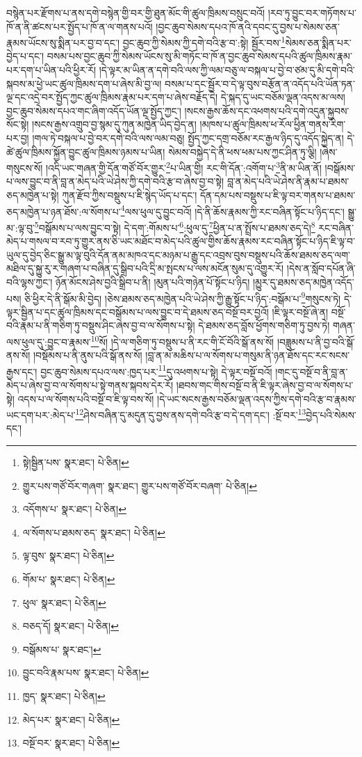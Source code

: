 བསྙེན་པར་རྫོགས་པ་ནས་དགེ་བསྙེན་གྱི་བར་གྱི་ཐུན་མོང་གི་ཚུལ་ཁྲིམས་བསྲུང་བའོ། །རབ་ཏུ་བྱུང་བར་གཏོགས་པ་ཁོ་ན་ནི་ཚངས་པར་སྤྱོད་པ་ཁོ་ན་ལ་གནས་པའོ། །བྱང་ཆུབ་སེམས་དཔའ་ཁོ་ནའི་དབང་དུ་བྱས་པ་སེམས་ཅན་རྣམས་ཡོངས་སུ་སྨིན་པར་བྱ་བ་དང་། བྱང་ཆུབ་ཀྱི་སེམས་ཀྱི་དགེ་བའི་རྩ་བ་:སྟེ། སྦྱོར་བས་\footnote{སྟེ།སྦྱིན་པས་  སྣར་ཐང་།  པེ་ཅིན། }སེམས་ཅན་སྨིན་པར་བྱེད་པ་དང་། བསམ་པས་བྱང་ཆུབ་ཀྱི་སེམས་ཡོངས་སུ་མི་གཏོང་བ་ཁོ་ན་བྱང་ཆུབ་སེམས་དཔའི་ཚུལ་ཁྲིམས་རྣམ་པར་དག་པ་ཡིན་པའི་ཕྱིར་རོ། །དེ་ལྟར་མ་ཡིན་ན་དགེ་བའི་ལས་ཀྱི་ལམ་བཅུ་ལ་བསྐལ་པ་བྱེ་བ་ཙམ་དུ་མི་དགེ་བའི་སྐབས་མ་ཕྱེ་ཡང་ཚུལ་ཁྲིམས་དག་པ་ཞེས་མི་བྱ་ལ། བསམ་པ་དང་སྦྱོར་བ་དེ་ལྟ་བུས་བརྩོན་ན་འདོད་པའི་ཡོན་ཏན་ལྔ་དང་འདྲེ་བར་སྤྱོད་ཀྱང་ཚུལ་ཁྲིམས་རྣམ་པར་དག་པ་ཞེས་བརྗོད་དེ། དེ་སྐད་དུ་ཡང་བཅོམ་ལྡན་འདས་མ་ལས། བྱང་ཆུབ་སེམས་དཔའ་གང་ཞིག་འདོད་ཡོན་ལྔ་སྤྱོད་ཀྱང་། །སངས་རྒྱས་ཆོས་དང་འཕགས་པའི་དགེ་འདུན་སྐྱབས་སོང་སྟེ། །སངས་རྒྱས་འགྲུབ་བྱ་སྙམ་དུ་ཀུན་མཁྱེན་ཡིད་བྱེད་ན། །མཁས་པ་ཚུལ་ཁྲིམས་ཕ་རོལ་ཕྱིན་གནས་རིག་པར་བྱ། །གལ་ཏེ་བསྐལ་པ་བྱེ་བར་དགེ་བའི་ལས་ལམ་བཅུ། སྤྱོད་ཀྱང་དགྲ་བཅོམ་རང་རྒྱལ་ཉིད་དུ་འདོད་སྐྱེད་ན། དེ་ཚེ་ཚུལ་ཁྲིམས་སྐྱོན་བྱུང་ཚུལ་ཁྲིམས་ཉམས་པ་ཡིན། སེམས་བསྐྱེད་དེ་ནི་ཕས་ཕམ་པས་ཀྱང་ཤིན་ཏུ་ལྕི། །ཞེས་གསུངས་སོ། །འདི་ཡང་གཞན་གྱི་དོན་གཙོ་བོར་གྱུར་\footnote{གྱུར་པས་གཙོ་བོར་གཞག་  སྣར་ཐང་། གྱུར་པས་གཙོ་བོར་བཞག་  པེ་ཅིན། }པ་ཡིན་གྱི། རང་གི་དོན་:འགོག་པ་\footnote{འདོགས་པ་  སྣར་ཐང་།  པེ་ཅིན། }ནི་མ་ཡིན་ནོ། །བསྒོམས་པ་ལས་བྱུང་བ་ནི་བླ་ན་མེད་པའི་ཡེ་ཤེས་ཀྱི་དགེ་བའི་རྩ་བ་ཞེས་བྱ་བ་སྟེ། བླ་ན་མེད་པའི་ཡེ་ཤེས་ནི་རྣམ་པ་ཐམས་ཅད་མཁྱེན་པ་སྟེ། ཀུན་རྫོབ་ཀྱིས་བསྡུས་པ་ཇི་སྙེད་ཡོད་པ་དང་། དོན་དམ་པས་བསྡུས་པ་ཇི་ལྟ་བར་གནས་པ་ཐམས་ཅད་མཁྱེན་པ་ཉན་ཐོས་:ལ་སོགས་པ་\footnote{ལ་སོགས་པ་ཐམས་ཅད་  སྣར་ཐང་།  པེ་ཅིན། }ལས་ཕུལ་དུ་བྱུང་བའོ། །དེ་ནི་ཆོས་རྣམས་ཀྱི་རང་བཞིན་སྟོང་པ་ཉིད་དང་། སྒྱུ་མ་:ལྟ་བུ་\footnote{ལྟ་བུས་  སྣར་ཐང་།  པེ་ཅིན། }བསྒོམས་པ་ལས་བྱུང་བ་སྟེ། དེ་དག་:གོམས་པ་\footnote{གོམ་པ་  སྣར་ཐང་།  པེ་ཅིན། }:ཕུལ་དུ་\footnote{ཕུལ་  སྣར་ཐང་།  པེ་ཅིན། }ཕྱིན་པ་ན་སྤྲོས་པ་ཐམས་ཅད་དེ།\footnote{བཅད་དོ།  སྣར་ཐང་།  པེ་ཅིན། } རང་བཞིན་མེད་པ་གསལ་བ་རབ་ཏུ་གྱུར་ནས་ཅི་ཡང་མཐོང་བ་མེད་པའི་ཚུལ་གྱིས་ཆོས་རྣམས་རང་བཞིན་སྟོང་པ་ཉིད་ཇི་ལྟ་བ་ཡུལ་དུ་བྱེད་ཅིང་སྒྱུ་མ་ལྟ་བུའི་དོན་ནམ་མཁའ་དང་མཉམ་པ་རྒྱུ་དང་འབྲས་བུས་བསྡུས་པའི་ཆོས་ཐམས་ཅད་ལག་མཐིལ་དུ་སྐྱུ་རུ་ར་གཞག་པ་བཞིན་དུ་སྒྲིབ་པའི་དྲི་མ་སྤངས་པ་ལས་མངོན་སུམ་དུ་འགྱུར་རོ། །དེས་ན་སློབ་དཔོན་ཞི་བའི་ལྷས་ཀྱང་། ཉོན་མོངས་ཤེས་བྱའི་སྒྲིབ་པ་ནི། །མུན་པའི་གཉེན་པོ་སྟོང་པ་ཉིད། །མྱུར་དུ་ཐམས་ཅད་མཁྱེན་འདོད་པས། ཅི་ཕྱིར་དེ་ནི་སྒོམ་མི་བྱེད། །ཅེས་ཐམས་ཅད་མཁྱེན་པའི་ཡེ་ཤེས་ཀྱི་རྒྱུ་སྟོང་པ་ཉིད་:བསྒོམ་པ་\footnote{བསྒོམས་པ་  སྣར་ཐང་། }གསུངས་ཏེ། དེ་ལྟར་སྦྱིན་པ་དང་ཚུལ་ཁྲིམས་དང་བསྒོམས་པ་ལས་བྱུང་བ་དེ་ཐམས་ཅད་བསྔོ་བར་བྱའོ། །ཇི་ལྟར་བསྔོ་ཞེ་ན། བསྔོ་བའི་རྣམ་པ་ནི་གཅིག་ཏུ་བསྡུས་ཤིང་ཞེས་བྱ་བ་ལ་སོགས་པ་སྟེ། དེ་ཐམས་ཅད་བློས་ཕྱོགས་གཅིག་ཏུ་བྱས་ཏེ། གཞན་ལས་ཕུལ་དུ་:བྱུང་བ་རྣམས་\footnote{བྱུང་བའི་རྣམ་པས་  སྣར་ཐང་།  པེ་ཅིན། }སོ། །དེ་ལ་གཅིག་ཏུ་བསྡུས་པ་ནི་རང་གི་ངོ་བོའི་སྒོ་ནས་སོ། །བཟླུམས་པ་ནི་བྱ་བའི་སྒོ་ནས་སོ། །བསྡོམས་པ་ནི་ནུས་པའི་སྒོ་ནས་སོ། །བླ་ན་མ་མཆིས་པ་ལ་སོགས་པ་གསུམ་ནི་ཉན་ཐོས་དང་རང་སངས་རྒྱས་དང་། བྱང་ཆུབ་སེམས་དཔའ་ལས་:ཁྱད་པར་\footnote{ཁྱད་  སྣར་ཐང་།  པེ་ཅིན། }དུ་འཕགས་པ་སྟེ། དེ་ལྟར་བསྔོ་བའོ། །གང་དུ་བསྔོ་བ་ནི་བླ་ན་མེད་པ་ཞེས་བྱ་བ་ལ་སོགས་པ་སྟེ་གནས་སྐབས་དེར་རོ། །ཐབས་གང་གིས་བསྔོ་བ་ནི་ཇི་ལྟར་ཞེས་བྱ་བ་ལ་སོགས་པ་སྟེ། འདས་པ་ལ་སོགས་པའི་བསྔོ་བ་ཇི་ལྟ་བས་སོ། །དེ་ཡང་སངས་རྒྱས་བཅོམ་ལྡན་འདས་ཀྱིས་དགེ་བའི་རྩ་བ་རྣམས་ཡང་དག་པར་:མེད་པ་\footnote{མེད་པར་  སྣར་ཐང་།  པེ་ཅིན། }ཤེས་བཞིན་དུ་མདུན་དུ་བྱས་ནས་དགེ་བའི་རྩ་བ་དེ་དག་དང་། :སྔོ་བར་\footnote{བསྔོ་བར་  སྣར་ཐང་།  པེ་ཅིན། }བྱེད་པའི་སེམས་དང་། 